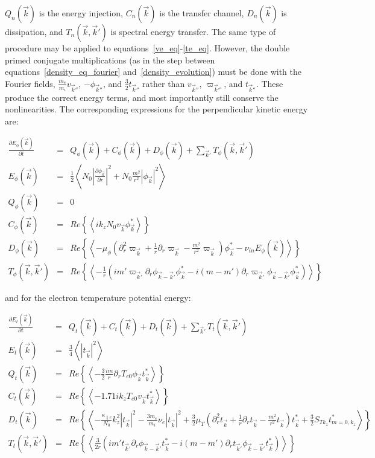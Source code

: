 \documentclass[showpacs,preprintnumbers,amsmath,amssymb,superscriptaddress,aip]{revtex4-1}
\def\beqar{\begin{eqnarray}}
\def\eeqar{\end{eqnarray}}
\newcommand{\pdiff}[2]{\frac{\partial#1}{\partial#2}}
\newcommand{\pdr}{\partial_r}
\newcommand{\pdrr}{\partial^2_r}
\newcommand{\nue}{\nu_{e}}
\newcommand{\nuin}{\nu_{in}}
\newcommand{\kpe}{\kappa_{\parallel e}}
\newcommand{\fmei}{\frac{m_e}{m_i}}
\begin{document}
$Q_n(\vec{k})$ is the energy injection, $C_n(\vec{k})$ is the transfer channel, $D_n(\vec{k})$ is dissipation, and $T_n(\vec{k},\vec{k}')$ is spectral energy transfer.
The same type of procedure may be applied to equations~\ref{ve_eq}-\ref{te_eq}. 
However, the double primed conjugate multiplications (as in the step between equations~\ref{density_eq_fourier} and~\ref{density_evolution}) 
must be done with the Fourier fields, $\fmei v_{\vec{k}''}$,  $- \phi_{\vec{k}''}$, and $\frac{3}{2} t_{\vec{k}''}$ rather than 
$v_{\vec{k}''}$, $\varpi_{\vec{k}''}$, and $t_{\vec{k}''}$.
These produce the correct energy terms, and most importantly still conserve the nonlinearities. The corresponding expressions for the perpendicular kinetic energy are:

\beqar
\label{Fourier_phi_evolution}
\pdiff{E_\phi(\vec{k})}{t} & = & Q_\phi(\vec{k}) + C_\phi(\vec{k}) + D_\phi(\vec{k}) + \sum_{\vec{k}'} T_\phi(\vec{k},\vec{k}') \\
E_\phi(\vec{k}) & = & \frac{1}{2} \left<  N_0 \left| \pdiff{\phi_{\vec{k}}}{r} \right|^2 + N_0 \frac{m^2}{r^2} |\phi_{\vec{k}}|^2  \right>\\
Q_\phi(\vec{k}) & = & 0 \\
C_\phi(\vec{k}) & = & Re \left\{ \left< i k_z N_0 v_{\vec{k}} \phi_{\vec{k}}^* \right> \right\} \\
D_\phi(\vec{k}) & = & Re \left\{ \left<  - \mu_\phi( \pdrr \varpi_{\vec{k}} + \frac{1}{r} \pdr \varpi_{\vec{k}} - \frac{m^2}{r^2} \varpi_{\vec{k}}) \phi_{\vec{k}}^* -  \nuin E_\phi(\vec{k})\right> \right\} \\
T_\phi(\vec{k},\vec{k}') & = & Re \left\{ \left< - \frac{1}{r} \left( i m' \varpi_{\vec{k}'} \pdr \phi_{\vec{k}-\vec{k}'} \phi_{\vec{k}}^*  - i (m - m') \pdr \varpi_{\vec{k}'} \phi_{\vec{k}-\vec{k}'} \phi_{\vec{k}}^*        \right) \right> \right\}
\eeqar

and for the electron temperature potential energy:

\beqar
\label{Fourier_te_evolution}
\pdiff{E_t(\vec{k})}{t} & = & Q_t(\vec{k}) + C_t(\vec{k}) + D_t(\vec{k}) + \sum_{\vec{k}'} T_t(\vec{k},\vec{k}') \\
E_t(\vec{k}) & = & \frac{3}{4} \left< |t_{\vec{k}}|^2  \right> \\
Q_t(\vec{k}) & = & Re \left\{ \left< - \frac{3}{2} \frac{i m}{r} \pdr T_{e0} \phi_{\vec{k}} t_{\vec{k}}^* \right> \right\} \\
C_t(\vec{k}) & = & Re \left\{ \left<  - 1.71 i k_z T_{e0} v_{\vec{k}} t_{\vec{k}}^* \right> \right\} \\
D_t(\vec{k}) & = & Re \left\{ \left< -\frac{\kpe}{N_0} k_z^2 |t_{\vec{k}}|^2  - \frac{3 m_e}{m_i} \nue |t_{\vec{k}}|^2 
+ \frac{3}{2} \mu_T( \pdrr t_{\vec{k}} + \frac{1}{r} \pdr t_{\vec{k}} - \frac{m^2}{r^2} t_{\vec{k}}) t_{\vec{k}}^*  + \frac{3}{2} S_{T k_z} t_{m=0,k_z}^*  \right> \right\} \\
T_t(\vec{k},\vec{k}') & = & Re \left\{ \left< \frac{3}{2 r} \left( i m' t_{\vec{k}'} \pdr \phi_{\vec{k}-\vec{k}'} t_{\vec{k}}^*  - i (m - m') \pdr t_{\vec{k}'} \phi_{\vec{k}-\vec{k}'} t_{\vec{k}}^*        \right) \right> \right\}
\eeqar
\end{document}
